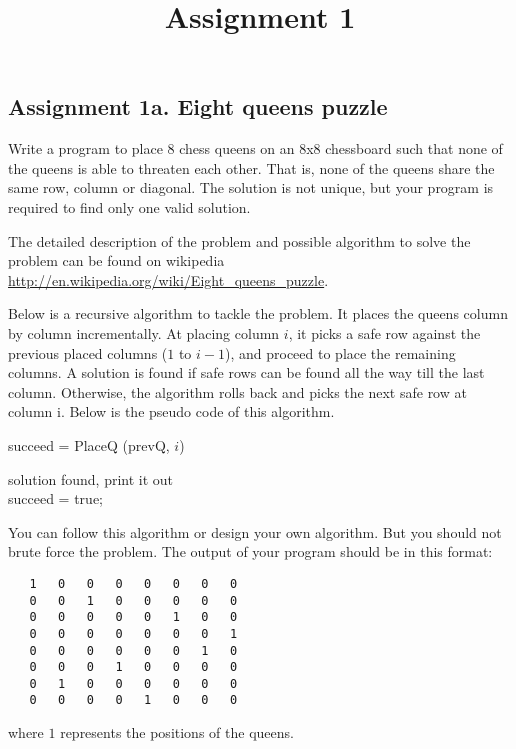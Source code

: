 \documentclass[12pt,a4paper,hidelinks,fleqn]{article}            %
\title{\vspace{-3ex}Assignment 1\vspace{-7ex}}
\date{}
\begin{document}
\maketitle
\subsection*{Assignment 1a. Eight queens puzzle}
Write a program to place 8 chess queens on an 8x8 chessboard 
such that none of the queens is able to threaten each other.
That is, none of the queens share the same row, column or diagonal.
The solution is not unique, but your program is required to find only one valid solution.

The detailed description of the problem and possible algorithm to solve the problem can be found on wikipedia \url{http://en.wikipedia.org/wiki/Eight_queens_puzzle}.

Below is a recursive algorithm to tackle the problem.
It places the queens column by column incrementally. 
At placing column $i$, it picks a safe row against the previous placed columns ($1$ to $i-1$), 
and proceed to place the remaining columns. 
A solution is found if safe rows can be found all the way till the last column.
Otherwise, the algorithm rolls back and picks the next safe row at column i.
Below is the pseudo code of this algorithm.

\begin{algorithm}
	\caption{succeed = PlaceQ (prevQ, $i$)}
	 {
		solution found, print it out \\
		succeed = true;
	}
\end{algorithm}

You can follow this algorithm or design your own algorithm.
But you should not brute force the problem.
The output of your program should be in this format:
\begin{verbatim}
   1   0   0   0   0   0   0   0
   0   0   1   0   0   0   0   0
   0   0   0   0   0   1   0   0
   0   0   0   0   0   0   0   1
   0   0   0   0   0   0   1   0
   0   0   0   1   0   0   0   0
   0   1   0   0   0   0   0   0
   0   0   0   0   1   0   0   0
\end{verbatim}
where $1$ represents the positions of the queens.
\end{document}
